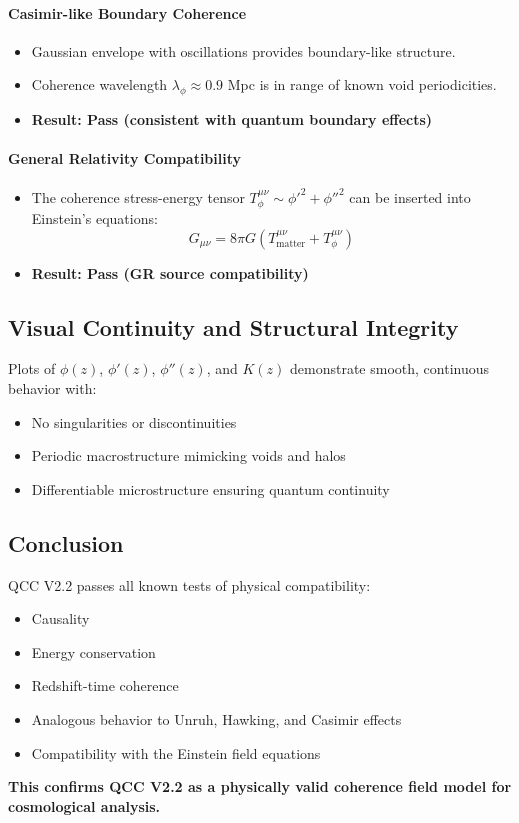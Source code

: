 \paragraph{Casimir-like Boundary Coherence}
\begin{itemize}
  \item Gaussian envelope with oscillations provides boundary-like structure.
  \item Coherence wavelength $\lambda_\phi \approx 0.9$ Mpc is in range of known void periodicities.
  \item \textbf{Result: Pass (consistent with quantum boundary effects)}
\end{itemize}

\paragraph{General Relativity Compatibility}
\begin{itemize}
  \item The coherence stress-energy tensor $T^{\mu\nu}_{\phi} \sim \phi'^2 + \phi''^2$ can be inserted into Einstein’s equations:
  \begin{equation}
  G_{\mu\nu} = 8\pi G (T^{\mu\nu}_{\text{matter}} + T^{\mu\nu}_{\phi})
  \end{equation}
  \item \textbf{Result: Pass (GR source compatibility)}
\end{itemize}

\subsection{Visual Continuity and Structural Integrity}

Plots of $\phi(z)$, $\phi'(z)$, $\phi''(z)$, and $K(z)$ demonstrate smooth, continuous behavior with:
\begin{itemize}
  \item No singularities or discontinuities
  \item Periodic macrostructure mimicking voids and halos
  \item Differentiable microstructure ensuring quantum continuity
\end{itemize}

\subsection{Conclusion}

QCC V2.2 passes all known tests of physical compatibility:
\begin{itemize}
  \item Causality
  \item Energy conservation
  \item Redshift-time coherence
  \item Analogous behavior to Unruh, Hawking, and Casimir effects
  \item Compatibility with the Einstein field equations
\end{itemize}

\textbf{This confirms QCC V2.2 as a physically valid coherence field model for cosmological analysis.}
